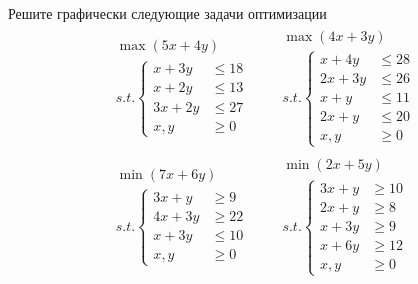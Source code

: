 \begin{exercise}
Решите графически следующие задачи оптимизации
\begin{align*}
	& \begin{gathered}
		\max(5x+4y) \\
		s.t.\left\{\begin{aligned}
			x+3y &\leqslant18 \\ x+2y &\leqslant13 \\ 
			3x+2y &\leqslant27 \\ x,y&\geqslant0
		\end{aligned}\right.
	\end{gathered} &
	& \begin{gathered}
		\max(4x+3y) \\
		s.t.\left\{\begin{aligned}
			x+4y &\leqslant 28 \\ 2x+3y &\leqslant 26 \\ 
			x+y &\leqslant 11 \\ 2x+y &\leqslant 20 \\ x,y&\geqslant0
		\end{aligned}\right.
	\end{gathered} \\
	& \begin{gathered}
		\min(7x+6y) \\
		s.t.\left\{\begin{aligned}
			3x+y &\geqslant 9 \\ 4x+3y &\geqslant 22 \\ 
			x+3y &\leqslant 10 \\ x,y&\geqslant0
		\end{aligned}\right.
	\end{gathered} &
	& \begin{gathered}
		\min(2x+5y) \\
		s.t.\left\{\begin{aligned}
			3x+y &\geqslant 10 \\ 2x+y &\geqslant 8 \\ 
			x+3y &\geqslant 9 \\ x+6y &\geqslant 12 \\ x,y&\geqslant0
		\end{aligned}\right.
	\end{gathered}
\end{align*}
\end{exercise}

